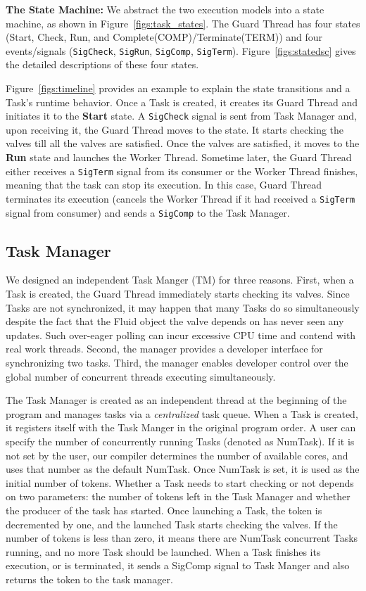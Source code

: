 \noindent\textbf{The State Machine:}
We abstract the two execution models into a state machine, as shown in Figure~\ref{figs:task_states}. The Guard Thread has four states (Start, Check, Run, and Complete(COMP)/Terminate(TERM)) and four events/signals (\texttt{SigCheck}, \texttt{SigRun}, \texttt{SigComp}, \texttt{SigTerm}). Figure~\ref{figs:statedsc} gives the detailed descriptions of these four states. 

Figure~\ref{figs:timeline} provides an example to explain the state transitions and a Task's runtime behavior. Once a Task is created, it creates its Guard Thread and initiates it to the \textbf{Start} state. A \texttt{SigCheck} signal is sent from Task Manager and, upon receiving it, the Guard Thread moves to the  state. It starts checking the valves till all the valves are satisfied. Once the valves are satisfied, it moves to the \textbf{Run} state and launches the Worker Thread. Sometime later, the Guard Thread either receives a \texttt{SigTerm} signal from its consumer or the Worker Thread finishes, meaning that the task can stop its execution. In this case, Guard Thread terminates its execution (cancels the Worker Thread if it had received a \texttt{SigTerm} signal from consumer) and sends a \texttt{SigComp} to the Task Manager.

\subsection{Task Manager}
We designed an independent Task Manger (TM) for three reasons. First, when a Task is created, the Guard Thread immediately starts checking its valves. Since Tasks are not synchronized, it may happen that many Tasks do so simultaneously despite the fact that the Fluid object the valve depends on has never seen any updates. Such over-eager polling can incur excessive CPU time and contend with real work threads. Second, the manager provides a developer interface for synchronizing two tasks. Third, the manager enables developer control over the global number of concurrent threads executing simultaneously.

The Task Manager is created as an independent thread at the beginning of the program and manages tasks via a \textit{centralized} task queue. When a Task is created, it registers itself with the Task Manger in the original program order. A user can specify the number of concurrently running Tasks (denoted as NumTask). If it is not set by the user, our compiler determines the number of available cores, and uses that number as the default NumTask. Once NumTask is set, it is used as the initial number of tokens. Whether a Task needs to start checking or not depends on two parameters: the number of tokens left in the Task Manager and whether the producer of the task has started. Once launching a Task, the token is decremented by one, and the launched Task starts checking the valves. If the number of tokens is less than zero, it means there are NumTask concurrent Tasks running, and no more Task should be launched. When a Task finishes its execution, or is terminated, it sends a SigComp signal to Task Manger and also returns the token to the task manager.



